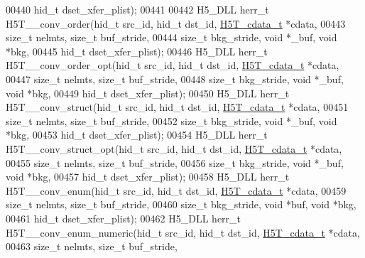 \begin{DoxyCode}
00440                             hid\_t dset\_xfer\_plist);
00441 
00442 H5\_DLL herr\_t H5T\_\_conv\_order(hid\_t src\_id, hid\_t dst\_id, \hyperlink{struct_h5_t__cdata__t}{H5T\_cdata\_t} *cdata,
00443                 \textcolor{keywordtype}{size\_t} nelmts, \textcolor{keywordtype}{size\_t} buf\_stride,
00444                             \textcolor{keywordtype}{size\_t} bkg\_stride, \textcolor{keywordtype}{void} *\_buf, \textcolor{keywordtype}{void} *bkg,
00445                             hid\_t dset\_xfer\_plist);
00446 H5\_DLL herr\_t H5T\_\_conv\_order\_opt(hid\_t src\_id, hid\_t dst\_id, \hyperlink{struct_h5_t__cdata__t}{H5T\_cdata\_t} *cdata,
00447                             \textcolor{keywordtype}{size\_t} nelmts, \textcolor{keywordtype}{size\_t} buf\_stride,
00448                             \textcolor{keywordtype}{size\_t} bkg\_stride, \textcolor{keywordtype}{void} *\_buf, \textcolor{keywordtype}{void} *bkg,
00449                             hid\_t dset\_xfer\_plist);
00450 H5\_DLL herr\_t H5T\_\_conv\_struct(hid\_t src\_id, hid\_t dst\_id, \hyperlink{struct_h5_t__cdata__t}{H5T\_cdata\_t} *cdata,
00451                 \textcolor{keywordtype}{size\_t} nelmts, \textcolor{keywordtype}{size\_t} buf\_stride,
00452                             \textcolor{keywordtype}{size\_t} bkg\_stride, \textcolor{keywordtype}{void} *\_buf, \textcolor{keywordtype}{void} *bkg,
00453                             hid\_t dset\_xfer\_plist);
00454 H5\_DLL herr\_t H5T\_\_conv\_struct\_opt(hid\_t src\_id, hid\_t dst\_id, \hyperlink{struct_h5_t__cdata__t}{H5T\_cdata\_t} *cdata,
00455                             \textcolor{keywordtype}{size\_t} nelmts, \textcolor{keywordtype}{size\_t} buf\_stride,
00456                             \textcolor{keywordtype}{size\_t} bkg\_stride, \textcolor{keywordtype}{void} *\_buf, \textcolor{keywordtype}{void} *bkg,
00457                             hid\_t dset\_xfer\_plist);
00458 H5\_DLL herr\_t H5T\_\_conv\_enum(hid\_t src\_id, hid\_t dst\_id, \hyperlink{struct_h5_t__cdata__t}{H5T\_cdata\_t} *cdata,
00459                 \textcolor{keywordtype}{size\_t} nelmts, \textcolor{keywordtype}{size\_t} buf\_stride,
00460                             \textcolor{keywordtype}{size\_t} bkg\_stride, \textcolor{keywordtype}{void} *buf, \textcolor{keywordtype}{void} *bkg,
00461                             hid\_t dset\_xfer\_plist);
00462 H5\_DLL herr\_t H5T\_\_conv\_enum\_numeric(hid\_t src\_id, hid\_t dst\_id, \hyperlink{struct_h5_t__cdata__t}{H5T\_cdata\_t} *cdata,
00463                 \textcolor{keywordtype}{size\_t} nelmts, \textcolor{keywordtype}{size\_t} buf\_stride,

\end{DoxyCode}
